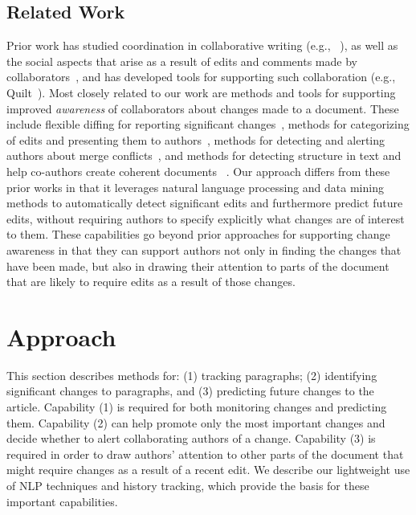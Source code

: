 \subsection{Related Work}\label{related-work}

Prior work has studied coordination in collaborative writing (e.g.,
~\cite{neuwirth2001computer,kittur2007he}), as well as the social
aspects that arise as a result of edits and comments made by
collaborators~\cite{birnholtz2013write}, and has developed tools for
supporting such collaboration (e.g., Quilt~\cite{fish1988quilt}). Most
closely related to our work are methods and tools for supporting
improved \emph{awareness} of collaborators about changes made to a
document. These include flexible diffing for reporting significant
changes~\cite{neuwirth1992flexible}, methods for categorizing of edits
and presenting them to
authors~\cite{fong2010did,papadopoulou2007structured,tam2006framework},
methods for detecting and alerting authors about merge
conflicts~\cite{hainsworth2006enabling}, and methods for detecting
structure in text and help co-authors create coherent documents~
\cite{de2007narrative}. Our approach differs from these prior works in
that it leverages natural language processing and data mining methods to
automatically detect significant edits and furthermore predict future
edits, without requiring authors to specify explicitly what changes are
of interest to them. These capabilities go beyond prior approaches for
supporting change awareness in that they can support authors not only in
finding the changes that have been made, but also in drawing their
attention to parts of the document that are likely to require edits as a
result of those changes.

\section{Approach}\label{approach}

This section describes methods for: (1) tracking paragraphs; (2)
identifying significant changes to paragraphs, and (3) predicting future
changes to the article. Capability (1) is required for both monitoring
changes and predicting them. Capability (2) can help promote only the
most important changes and decide whether to alert collaborating authors
of a change. Capability (3) is required in order to draw authors'
attention to other parts of the document that might require changes as a
result of a recent edit. We describe our lightweight use of NLP
techniques and history tracking, which provide the basis for these
important capabilities.

